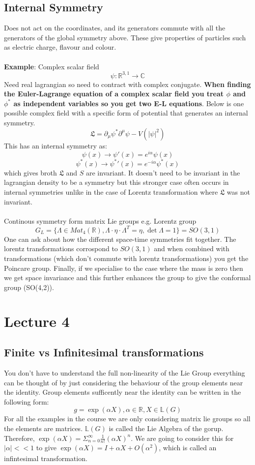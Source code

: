 \documentclass[12pt, a4paper, twoside, titlepage]{article}
\begin{document}
\subsection{Internal Symmetry}
Does not act on the coordinates, and its generators commute with all the generators of the global symmetry above. These give properties of particles such as electric charge, flavour and colour.\\\\
\textbf{Example}: Complex scalar field
$$
\psi: \mathbb{R}^{3,1} \rightarrow \mathbb{C}
$$
Need real lagrangian so need to contract with complex conjugate. \textbf{When finding the Euler-Lagrange equation of a complex scalar field you treat $\phi$ and $\phi^*$ as independent variables so you get two E-L equations}. Below is one possible complex field with a specific form of potential that generates an internal symmetry.
$$
\mathfrak{L} = \partial_{\mu}\psi^* \partial^{\mu} \psi - V(|\psi|^2)
$$
This has an internal symmetry as:
$$
\psi(x) \rightarrow \psi'(x) = e^{i\alpha}\psi(x)
$$
$$
\psi^*(x) \rightarrow \psi^*'(x) = e^{-i\alpha}\psi^*(x)
$$
which gives broth $\mathfrak{L}$ and $S$ are invariant. It doesn't need to be invariant in the lagrangian density to be a symmetry but this stronger case often occurs in internal symmetries unlike in the case of Lorentz transformation where $\mathfrak{L}$ was not invariant.\\\\
Continous symmetry form matrix Lie groups e.g. Lorentz group
$$
G_L = \{\Lambda \in Mat_4(\mathbb{R}), \Lambda \cdot  \eta  \cdot \Lambda^T = \eta, \det \Lambda = 1\} = SO(3,1)
$$
One can ask about how the different space-time symmetries fit together. The lorentz transformations corrospond to $SO(3,1)$ and when combined with transformations (which don't commute with lorentz transformations) you get the Poincare group. Finally, if we specialise to the case where the mass is zero then we get space invariance and this further enhances the group to give the conformal group (SO(4,2)).
\section{Lecture 4}
\subsection{Finite vs Infinitesimal transformations}
You don't have to understand the full non-linearity of the Lie Group everything can be thought of by just considering the behaviour of the group elements near the identity. Group elements sufficently near the identity can be written in the following form:
$$
g = \exp(\alpha X), \alpha \in \mathbb{R}, X \in \mathbb{L}(G)
$$
For all the examples in the course we are only considering matrix lie groups so all the elements are matrices. $\mathbb{L}(G)$ is called the Lie Algebra of the gorup. Therefore, $\exp( \alpha X) = \Sigma_{n=0}^{\infty} \frac{1}{n!} (\alpha X)^n$. We are going to consider this for $|\alpha| <<1$ to give $\exp( \alpha X) = I + \alpha X + O(\alpha^2)$, which is called an infintesimal transformation. 
\end{document}
